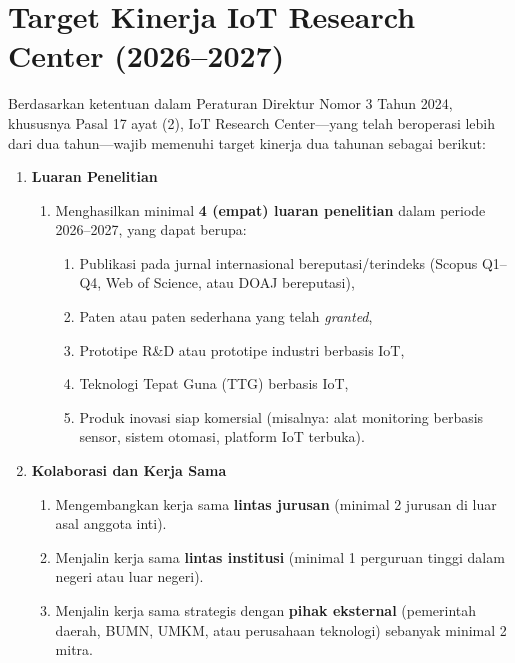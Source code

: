 \documentclass[12pt,a4paper]{article}
\begin{document}

\section{Target Kinerja IoT Research Center (2026--2027)}

Berdasarkan ketentuan dalam Peraturan Direktur Nomor 3 Tahun 2024, khususnya Pasal 17 ayat (2), IoT Research Center—yang telah beroperasi lebih dari dua tahun—wajib memenuhi target kinerja dua tahunan sebagai berikut:

\begin{enumerate}[leftmargin=*]
    \item \textbf{Luaran Penelitian}
          \begin{enumerate}
              \item Menghasilkan minimal \textbf{4 (empat) luaran penelitian} dalam periode 2026--2027, yang dapat berupa:
                    \begin{enumerate}
                        \item Publikasi pada jurnal internasional bereputasi/terindeks (Scopus Q1--Q4, Web of Science, atau DOAJ bereputasi),
                        \item Paten atau paten sederhana yang telah \textit{granted},
                        \item Prototipe R\&D atau prototipe industri berbasis IoT,
                        \item Teknologi Tepat Guna (TTG) berbasis IoT,
                        \item Produk inovasi siap komersial (misalnya: alat monitoring berbasis sensor, sistem otomasi, platform IoT terbuka).
                    \end{enumerate}
          \end{enumerate}

    \item \textbf{Kolaborasi dan Kerja Sama}
          \begin{enumerate}
              \item Mengembangkan kerja sama \textbf{lintas jurusan} (minimal 2 jurusan di luar asal anggota inti).
              \item Menjalin kerja sama \textbf{lintas institusi} (minimal 1 perguruan tinggi dalam negeri atau luar negeri).
              \item Menjalin kerja sama strategis dengan \textbf{pihak eksternal} (pemerintah daerah, BUMN, UMKM, atau perusahaan teknologi) sebanyak minimal 2 mitra.
          \end{enumerate}


\end{enumerate}
\end{document}
